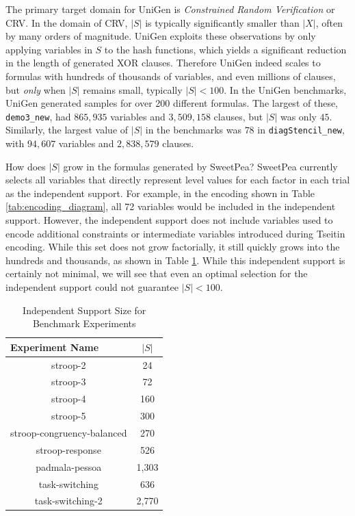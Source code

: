 The primary target domain for UniGen is \textit{Constrained Random Verification} or CRV. In the domain of CRV, $|S|$ is typically significantly smaller than $|X|$, often by many orders of magnitude. UniGen exploits these observations by only applying variables in $S$ to the hash functions, which yields a significant reduction in the length of generated XOR clauses. Therefore UniGen indeed scales to formulas with hundreds of thousands of variables, and even millions of clauses, but \textit{only} when $|S|$ remains small, typically $|S| < 100$. In the UniGen benchmarks, UniGen generated samples for over 200 different formulas. The largest of these, \texttt{demo3\_new}, had $865,935$ variables and $3,509,158$ clauses, but $|S|$ was only $45$. Similarly, the largest value of $|S|$ in the benchmarks was $78$ in \texttt{diagStencil\_new}, with $94,607$ variables and $2,838,579$ clauses. \cite{chakraborty_parallel_2015}

How does $|S|$ grow in the formulas generated by SweetPea? SweetPea currently selects all variables that directly represent level values for each factor in each trial as the independent support. For example, in the encoding shown in Table \ref{tab:encoding_diagram}, all 72 variables would be included in the independent support. However, the independent support does not include variables used to encode additional constraints or intermediate variables introduced during Tseitin encoding. While this set does not grow factorially, it still quickly grows into the hundreds and thousands, as shown in Table \ref{tab:benchmark_experiments_support}. While this independent support is certainly not minimal, we will see that even an optimal selection for the independent support could not guarantee $|S| < 100$.

\begin{table}[b]
  \centering
  \caption{Independent Support Size for Benchmark Experiments}
\begin{tabular}{|c|c|}
\hline
\multicolumn{1}{|l|}{Experiment Name}  & $|S|$   \\ \hline
stroop-2                               & 24      \\ \hline
stroop-3                               & 72      \\ \hline
stroop-4                               & 160     \\ \hline
stroop-5                               & 300     \\ \hline
stroop-congruency-balanced             & 270     \\ \hline
stroop-response                        & 526     \\ \hline
padmala-pessoa                         & 1,303   \\ \hline
task-switching                         & 636     \\ \hline
task-switching-2                       & 2,770   \\ \hline
\end{tabular}
\label{tab:benchmark_experiments_support}%
\end{table}




